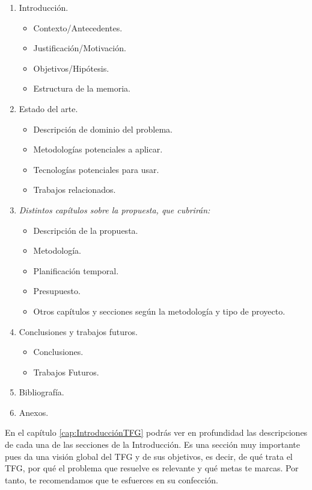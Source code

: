 \begin{enumerate}
    \item Introducción.
        \begin{itemize}
            \item Contexto/Antecedentes.
            \item Justificación/Motivación.
            \item Objetivos/Hipótesis.
            \item Estructura de la memoria.
        \end{itemize}
    \item Estado del arte.
        \begin{itemize}
            \item Descripción de dominio del problema.
            \item Metodologías potenciales a aplicar.
            \item Tecnologías potenciales para usar.
            \item Trabajos relacionados.
        \end{itemize}
    \item \textit{Distintos capítulos sobre la propuesta, que cubrirán:}
    \begin{itemize}
            \item Descripción de la propuesta.
            \item Metodología.
            \item Planificación temporal.
            \item Presupuesto.
            \item Otros capítulos y secciones según la metodología y tipo de proyecto.
        \end{itemize}
    \item Conclusiones y trabajos futuros.
    \begin{itemize}
            \item Conclusiones.
            \item Trabajos Futuros.
        \end{itemize}
    \item Bibliografía.
    \item Anexos.
\end{enumerate}

En el capítulo \ref{cap:IntroducciónTFG} podrás ver en profundidad las descripciones de cada una de las secciones de la Introducción. Es una sección muy importante pues da una visión global del TFG y de sus objetivos, es decir, de qué trata el TFG, por qué el problema que resuelve es relevante y qué metas te marcas. Por tanto, te recomendamos que te esfuerces en su confección. 

